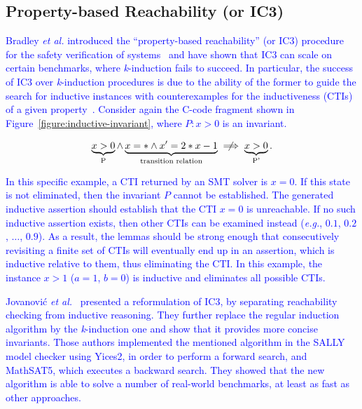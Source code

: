 \documentclass{cta-author}
\begin{document}
\subsection{Property-based Reachability (or IC3)}

\textcolor{blue}{Bradley {\it et al.} introduced  the ``property-based reachability'' (or IC$3$) procedure for the safety verification of systems~\cite{Bradley12,Bradley13} and have shown that IC$3$ can scale on certain benchmarks, where \textit{k}-induction fails to succeed. In particular, the success of IC3 over \textit{k}-induction procedures is due to the ability of the former to guide the search for inductive instances with counterexamples for the inductiveness (CTIs) of a given property~\cite{Bradley18}. Consider again the C-code fragment shown in Figure~\ref{figure:inductive-invariant}, where $P : x > 0$ is an invariant.}

\begin{equation}
\underbrace{x > 0}_{\text{P}} \wedge \underbrace{x = * \wedge x' = 2*x - 1}_{\text{transition relation}} \centernot\implies \underbrace{x > 0}_{\text{P'}}. \nonumber
\end{equation}

\textcolor{blue}{In this specific example, a CTI returned by an SMT solver is $x=0$. If this state is not eliminated, then the invariant $P$ cannot be established. The generated inductive assertion should establish that the CTI $x=0$  is unreachable. If no such inductive assertion exists, then other CTIs can be examined instead ({\it e.g.}, $0.1$, $0.2$, $\dots$, $0.9$). As a result, the lemmas should be strong enough that consecutively revisiting a finite set of CTIs will eventually end up in an assertion, which is inductive relative to them, thus eliminating the CTI. In this example, the instance $x > 1$ ($a=1$, $b=0$) is inductive and eliminates all possible CTIs.}

\textcolor{blue}{Jovanovi\'{c} {\it et al.}~\cite{Jovanovic:2016:PK:3077629.3077648} presented a reformulation of IC3, by separating reachability checking from inductive reasoning. They further replace the regular induction algorithm by the \textit{k}-induction one and show that it provides more concise invariants. Those authors implemented the mentioned algorithm in the SALLY model checker using Yices2, in order to perform a forward search, and MathSAT5, which executes a backward search. They showed that the new algorithm is able to solve a number of real-world benchmarks, at least as fast as other approaches.}
\end{document}

